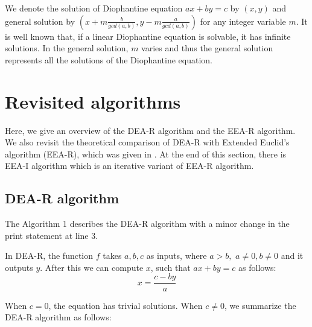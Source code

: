 \documentclass[pdflatex,sn-mathphys-num]{sn-jnl}%
\theoremstyle{thmstyleone}%
\theoremstyle{thmstyletwo}%
\theoremstyle{thmstylethree}%
\begin{document}
\par We denote the solution of Diophantine equation $ax+by=c$ by $(x,y)$ and general solution by $(x+m\frac{b}{gcd(a,b)}, y-m\frac{a}{gcd(a,b)})$ for any integer variable $m$. It is well known that, if a linear Diophantine equation is solvable, it has infinite solutions. In the general solution, $m$ varies and thus the general solution represents all the solutions of the Diophantine equation.





\section{Revisited algorithms}\label{secRAlgo}
Here, we give an overview of the  DEA-R algorithm and the EEA-R algorithm. We also revisit the theoretical comparison of DEA-R  with Extended Euclid's algorithm (EEA-R), which was given in \cite{deora2023algorithm}. At the end of this section, there is EEA-I algorithm which is an iterative variant of EEA-R algorithm.  
\subsection{DEA-R algorithm} The Algorithm 1 describes the DEA-R algorithm with a minor change in the print statement at line 3. 

\begin{algorithm}
\caption{\textbf{DEA-R} Algorithm to solve 2-variable Linear Diophantine equation \cite{deora2023algorithm}}




\end{algorithm}
In DEA-R, the function $f$ takes $a,b,c$ as inputs, where $a>b,\,\, a\ne0, b\ne 0$ and it outputs $y$. After this  we can compute $x$, such that $ax+by=c$ as follows:
$$x=\frac{c-by}{a}$$

When $c=0$, the equation has trivial solutions. When $c\ne 0$, we summarize the DEA-R algorithm as follows:
\end{document}
